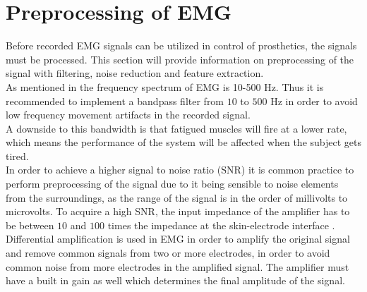 \section{Preprocessing of EMG}

Before recorded EMG signals can be utilized in control of prosthetics, the signals must be processed. This section will provide information on preprocessing of the signal with filtering, noise reduction and feature extraction. \\
As mentioned in  the frequency spectrum of EMG is 10-500 Hz. Thus it is recommended to implement a bandpass filter from $10$ to $500$ Hz in order to avoid low frequency movement artifacts in the recorded signal. \\
A downside to this bandwidth is that fatigued muscles will fire at a lower rate, which means the performance of the system will be affected when the subject gets tired. \cite{cram2012} \\
In order to achieve a higher signal to noise ratio (SNR) it is common practice to perform preprocessing of the signal due to it being sensible to noise elements from the surroundings, as the range of the signal is in the order of millivolts to microvolts. To acquire a high SNR, the input impedance of the amplifier has to be between $10$ and $100$ times the impedance at the skin-electrode interface \cite{cram2012}. \\
%
%
Differential amplification is used in EMG in order to amplify the original signal and remove common signals from two or more electrodes, in order to avoid common noise from more electrodes in the amplified signal. The amplifier must have a built in gain as well which determines the final amplitude of the signal.
%
%

